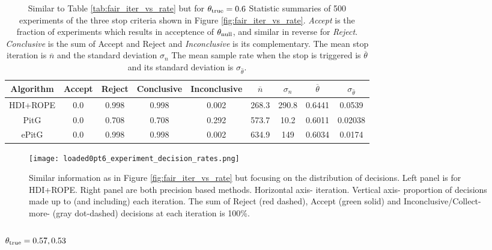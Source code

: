 \begin{table}[h!]\label{tab:loaded0pt6_iter_vs_rate}
  \begin{center}
  \begin{tabular}{c|c|c|c|c|c|c|c|c}
    \hline
    Algorithm & Accept & Reject & Conclusive & Inconclusive & $\overline{n}$ & $\sigma_n$ & $\overline{\theta}$ & $\sigma_{\hat{\theta}}$\\
    \hline
    HDI+ROPE & 0.0	& 0.998	& 0.998 &	0.002	& 268.3 &	290.8 & 0.6441 &	0.0539 \\
    PitG & 0.0 &	0.708 &	0.708 &	0.292	& 573.7	& 10.2 &	0.6011 &	0.02038 \\
    ePitG & 0.0	& 0.998	& 0.998	& 0.002	& 634.9	& 149	& 0.6034	 & 0.0174 \\
    \hline
  \end{tabular}
  \caption{Similar to Table \ref{tab:fair_iter_vs_rate} but for $\theta_{\rm true}=0.6$ Statistic summaries of 500 experiments of the three stop criteria shown in
  Figure \ref{fig:fair_iter_vs_rate}. {\it Accept}
  is the fraction of experiments which results in acceptence of $\theta_{\rm null}$,
  and similar in reverse for {\it Reject}. {\it Conclusive} is the sum of Accept
  and Reject and {\it Inconclusive} is its complementary.
  The mean stop iteration is $\overline{n}$ and the standard deviation $\sigma_n$
  The mean sample rate when the stop is triggered is $\overline{\theta}$ and its standard deviation is $\sigma_{\hat{\theta}}$.
  }
\end{center}
\end{table}

\begin{figure}[h!]
  \centering
  \texttt{[image: loaded0pt6\_experiment\_decision\_rates.png]}
  \caption{Similar information as in Figure \ref{fig:fair_iter_vs_rate} but focusing on
  the distribution of decisions. Left panel is for HDI+ROPE. Right panel are both
  precision based methods. Horizontal axis- iteration. Vertical axis- proportion of
  decisions made up to (and including) each iteration. The sum of Reject (red dashed),
  Accept (green solid) and Inconclusive/Collect-more- (gray dot-dashed) decisions at
  each iteration is 100\%.
  }
  \label{fig:loaded0pt6_decisions}
\end{figure}


\subsubsection{$\theta_{\rm true}=0.57, 0.53$}

